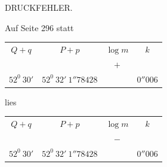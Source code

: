 \par\bigskip{}
\begin{center}\large DRUCKFEHLER.\end{center}
\par\noindent Auf Seite 296 statt
\begin{center}
\begin{tabular}{c|c|c|c}
\(Q+q\)&\(P+p\)&\(\log m\)&\(k\)\\
&&\(+\)&\\
\(52^{0}\ 30'\)&\(52^{0}\ 32'\ 1''78428\)&&\(0''006\)
\end{tabular}
\end{center}
\noindent lies
\begin{center}
\begin{tabular}{c|c|c|c}
\(Q+q\)&\(P+p\)&\(\log m\)&\(k\)\\
&&\(-\)&\\
\(52^{0}\ 30'\)&\(52^{0}\ 32'\ 1''78428\)&&\(0''006\)
\end{tabular}
\end{center}
